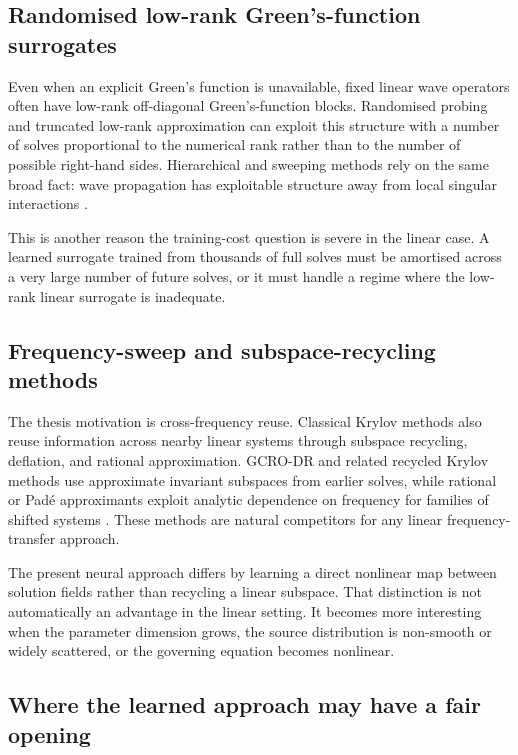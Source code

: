 \subsection{Randomised low-rank Green's-function surrogates}
\label{subsec:discussion-low-rank}

Even when an explicit Green's function is unavailable, fixed linear wave
operators often have low-rank off-diagonal Green's-function blocks. Randomised
probing and truncated low-rank approximation can exploit this structure with a
number of solves proportional to the numerical rank rather than to the number
of possible right-hand sides. Hierarchical and sweeping methods rely on the
same broad fact: wave propagation has exploitable structure away from local
singular interactions \cite{Engquist2011}.

This is another reason the training-cost question is severe in the linear
case. A learned surrogate trained from thousands of full solves must be
amortised across a very large number of future solves, or it must handle a
regime where the low-rank linear surrogate is inadequate.

\subsection{Frequency-sweep and subspace-recycling methods}
\label{subsec:discussion-recycling}

The thesis motivation is cross-frequency reuse. Classical Krylov methods also
reuse information across nearby linear systems through subspace recycling,
deflation, and rational approximation. GCRO-DR and related recycled Krylov
methods use approximate invariant subspaces from earlier solves, while
rational or Padé approximants exploit analytic dependence on frequency for
families of shifted systems \cite{ParksEtAl2006}. These methods are natural
competitors for any linear frequency-transfer approach.

The present neural approach differs by learning a direct nonlinear map between
solution fields rather than recycling a linear subspace. That distinction is
not automatically an advantage in the linear setting. It becomes more
interesting when the parameter dimension grows, the source distribution is
non-smooth or widely scattered, or the governing equation becomes nonlinear.

\subsection{Where the learned approach may have a fair opening}
\label{subsec:discussion-fair-opening}

